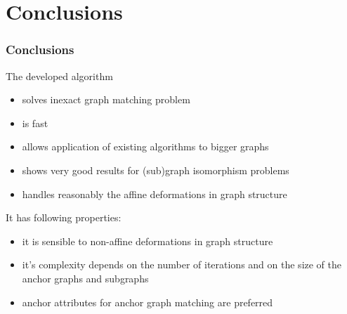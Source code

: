 \documentclass[hyperref={pdfpagelabels=false}]{beamer}
\begin{document}
\section{Conclusions}
\begin{frame} %
\frametitle{Conclusions}
	The developed algorithm
	\begin{itemize}
		\item solves inexact graph matching problem
		\item is fast
		\item allows application of existing algorithms to bigger graphs
		\item shows very good results for (sub)graph isomorphism problems
		\item handles reasonably the affine deformations in graph structure
	\end{itemize}

	It has following properties:
	\begin{itemize}
		\item it is sensible to non-affine deformations in graph structure
		\item it's complexity depends on the number of iterations and on the size of the anchor graphs and subgraphs
		\item anchor attributes for anchor graph matching are preferred
	\end{itemize}
\end{frame}
\end{document}
